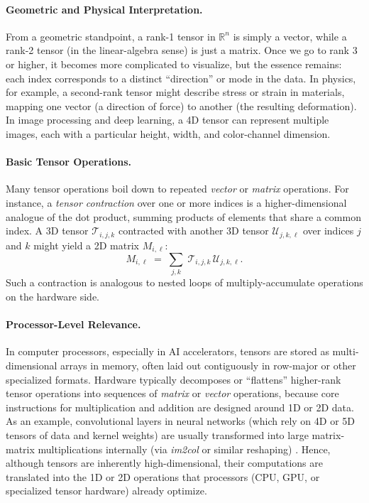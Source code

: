 \paragraph{Geometric and Physical Interpretation.}
From a geometric standpoint, a rank-1 tensor in $\mathbb{R}^n$ is simply a vector, 
while a rank-2 tensor (in the linear-algebra sense) is just a matrix. Once we go to rank 3 or higher, 
it becomes more complicated to visualize, but the essence remains: each index corresponds to a distinct 
``direction'' or mode in the data. In physics, for example, a second-rank tensor might describe stress 
or strain in materials, mapping one vector (a direction of force) to another (the resulting deformation). 
In image processing and deep learning, a 4D tensor can represent multiple images, each with a particular 
height, width, and color-channel dimension.

\paragraph{Basic Tensor Operations.}
Many tensor operations boil down to repeated \emph{vector} or \emph{matrix} operations. 
For instance, a \emph{tensor contraction} over one or more indices is a higher-dimensional analogue 
of the dot product, summing products of elements that share a common index. A 3D tensor $\mathcal{T}_{i,j,k}$ 
contracted with another 3D tensor $\mathcal{U}_{j,k,\ell}$ over indices $j$ and $k$ might yield a 
2D matrix $M_{i,\ell}$:
\[
M_{i,\ell} \;=\;\sum_{j,k}\; \mathcal{T}_{i,j,k}\,\mathcal{U}_{j,k,\ell}.
\]
Such a contraction is analogous to nested loops of multiply-accumulate operations on the hardware side. 

\paragraph{Processor-Level Relevance.}
In computer processors, especially in AI accelerators, tensors are stored as multi-dimensional 
arrays in memory, often laid out contiguously in row-major or other specialized formats. 
Hardware typically decomposes or ``flattens'' higher-rank tensor operations into sequences of 
\emph{matrix} or \emph{vector} operations, because core instructions for multiplication 
and addition are designed around 1D or 2D data. As an example, convolutional layers in neural 
networks (which rely on 4D or 5D tensors of data and kernel weights) are usually transformed 
into large matrix-matrix multiplications internally (via \textit{im2col} or similar reshaping) \cite{chetlur2014cudnn}. 
Hence, although tensors are inherently high-dimensional, their computations are translated into 
the 1D or 2D operations that processors (CPU, GPU, or specialized tensor hardware) already optimize.

